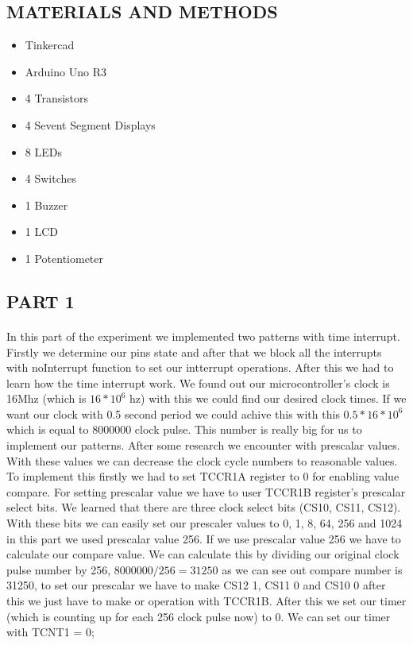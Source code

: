 \documentclass[pdftex,12pt,a4paper]{article}
\begin{document}
\begin{flushleft}
\section{MATERIALS AND METHODS}
\begin{itemize}
    \item Tinkercad
    \item Arduino Uno R3
    \item 4 Transistors
    \item 4 Sevent Segment Displays
    \item 8 LEDs
    \item 4 Switches
    \item 1 Buzzer
    \item 1 LCD
    \item 1 Potentiometer
\end{itemize}

\subsection{PART 1}
\paragraph{}
In this part of the experiment we implemented two patterns with time interrupt. Firstly we determine our pins state and after that we block all the interrupts with noInterrupt function to set our intterrupt operations. After this we had to learn how the time interrupt work. We found out our microcontroller's clock is 16Mhz (which is $16*10^6$ hz) with this we could find our desired clock times. If we want our clock with 0.5 second period we could achive this with this $0.5 * 16 * 10^6 $ which is equal to 8000000 clock pulse. This number is really big for us to implement our patterns. After some research we encounter with prescalar values. With these values we can decrease the clock cycle numbers to reasonable values. To implement this firstly we had to set TCCR1A register to 0 for enabling value compare. For setting prescalar value we have to user TCCR1B register's prescalar select bits. We learned that there are three clock select bits (CS10, CS11, CS12). With these bits we can easily set our prescaler values to 0, 1, 8, 64, 256 and 1024 in this part we used prescalar value 256. If we use prescalar value 256 we have to calculate our compare value. We can calculate this by dividing our original clock pulse number by 256, $8000000 / 256 = 31250 $ as we can see out compare number is 31250, to set our prescalar we have to make CS12 1, CS11 0 and CS10 0 after this we just have to make or operation with TCCR1B. After this we set our timer (which is counting up for each 256 clock pulse now) to 0. We can set our timer with TCNT1 = 0;

\end{flushleft}
\end{document}
